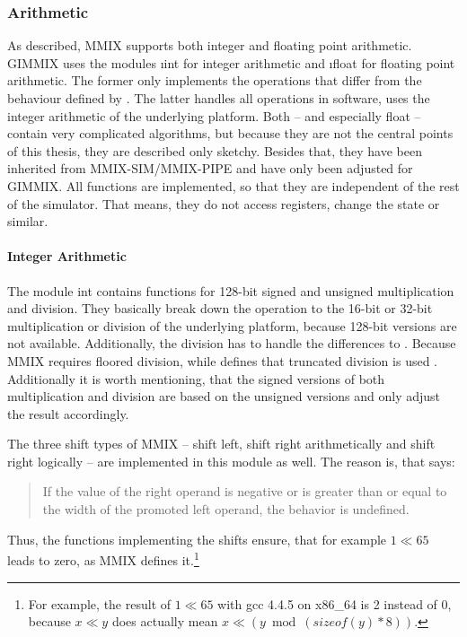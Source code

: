 \subsubsection{Arithmetic}

As described, MMIX supports both integer and floating point arithmetic. GIMMIX uses the modules \i{int} for integer arithmetic and \i{float} for floating point arithmetic. The former only implements the operations that differ from the behaviour defined by . The latter handles all operations in software, \ie uses the integer arithmetic of the underlying platform. Both -- and especially float -- contain very complicated algorithms, but because they are not the central points of this thesis, they are described only sketchy. Besides that, they have been inherited from MMIX-SIM/MMIX-PIPE and have only been adjusted for GIMMIX. All functions are implemented, so that they are independent of the rest of the simulator. That means, they do not access registers, change the state or similar.

\paragraph{Integer Arithmetic}

The module int contains functions for 128-bit signed and unsigned multiplication and division. They basically break down the operation to the 16-bit or 32-bit multiplication or division of the underlying platform, because 128-bit versions are not available. Additionally, the division has to handle the differences to . Because MMIX requires floored division, while  defines that truncated division is used \citep[pg. 82]{c99std}. Additionally it is worth mentioning, that the signed versions of both multiplication and division are based on the unsigned versions and only adjust the result accordingly.

The three shift types of MMIX -- shift left, shift right arithmetically and shift right logically -- are implemented in this module as well. The reason is, that  says:
\begin{quote}
If the value of the right operand is negative or is greater than or equal to the width of the promoted left operand, the behavior is undefined. \citep[pg. 84]{c99std}
\end{quote}
Thus, the functions implementing the shifts ensure, that for example $1 \ll 65$ leads to zero, as MMIX defines it.\footnote{For example, the result of $1 \ll 65$ with \gls{gcc} 4.4.5 on x86\_64 is 2 instead of 0, because $x \ll y$ does actually mean $x \ll (y \bmod (sizeof(y)*8))$.}

